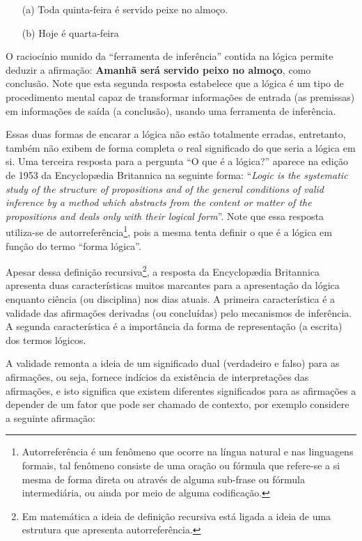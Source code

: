\begin{itemize}
	\item[(a)] Toda quinta-feira é servido peixe no almoço.
	\item[(b)] Hoje é quarta-feira
\end{itemize}

O raciocínio munido da ``ferramenta de inferência'' contida na lógica permite deduzir a afirmação: \textbf{Amanhã será servido peixo no almoço}, como conclusão. Note que esta segunda resposta estabelece que a lógica é um tipo de procedimento mental capaz de transformar informações de entrada (as premissas) em informações de saída (a conclusão), usando uma ferramenta de inferência.

Essas duas formas de encarar a lógica não estão totalmente erradas, entretanto, também não exibem de forma completa o real significado do que seria a lógica em si. Uma terceira resposta para a pergunta ``O que é a lógica?'' aparece na edição de 1953 da Encyclopædia Britannica na seguinte forma: ``\textit{Logic is the systematic study of the structure of propositions and of the general conditions of valid inference by a method which abstracts from the content or matter of the propositions and deals only with their logical form}''. Note que essa resposta utiliza-se de autorreferência\footnote{Autorreferência é um fenômeno que ocorre na língua natural e nas linguagens formais, tal fenômeno consiste de uma oração ou fórmula que refere-se a si mesma de forma direta ou através de alguma sub-frase ou fórmula intermediária, ou ainda por meio de alguma codificação.}, pois a mesma tenta definir o que é a lógica em função do termo ``forma lógica''.

Apesar dessa definição recursiva\footnote{Em matemática a ideia de definição recursiva está ligada a ideia de uma estrutura que apresenta autorreferência.}, a resposta da Encyclopædia Britannica apresenta duas características muitos marcantes para a apresentação da lógica enquanto ciência (ou disciplina) nos dias atuais. A primeira característica é a validade das afirmações derivadas (ou concluídas) pelo mecanismos de inferência. A segunda característica é a importância da forma de representação (a escrita) dos termos lógicos. 

A validade remonta a ideia de um significado dual (verdadeiro e falso) para as afirmações, ou seja, fornece indícios da existência de interpretações das afirmações, e isto significa que existem diferentes significados para as afirmações a depender de um fator que pode ser chamado de contexto, por exemplo considere a seguinte afirmação: 

